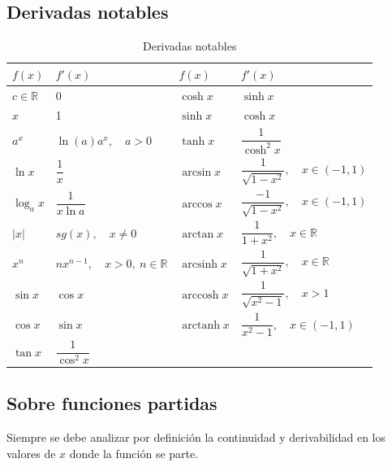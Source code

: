 \documentclass[11pt,titlepage]{article}
\DeclareMathOperator{\arcsinh}{arcsinh}
\DeclareMathOperator{\arccosh}{arccosh}
\DeclareMathOperator{\arctanh}{arctanh}
\begin{document}
\subsection{Derivadas notables}
\begin{table}[h!]
	\centering
	\setlength{\tabcolsep}{10pt} %
	\renewcommand{\arraystretch}{2.5} %
	\begin{tabularx}{\textwidth}{lX||lX}
		\toprule
		$f(x)$            & $f'(x)$                                  & $f(x)$       & $f'(x)$                                          \\
		\midrule
		$c\in \mathbb{R}$ & 0                                        & $\cosh x$    & $\sinh x$                                        \\
		$x$               & 1                                        & $\sinh x$    & $\cosh x$                                        \\
		$a^{x}$           & $\ln(a)a^{x}, \quad a>0$                 & $\tanh x$    & $\dfrac{1}{\cosh^2 x}$                           \\
		$\ln x$           & $\dfrac{1}{x}$                           & $\arcsin x$  & $\dfrac{1}{\sqrt{1-x^2}}, \quad x\in (-1,1)$     \\
		$\log_{a} x$      & $\dfrac{1}{x\ln a}$                      & $\arccos x$  & $\dfrac{-1}{\sqrt{1-x^2}}, \quad x\in (-1,1)$    \\
		$|x|$             & $sg(x), \quad x \neq 0$                  & $\arctan x$  & $\dfrac{1}{1+x^2}, \quad x\in \mathbb{R}$        \\
		$x^{n}$           & $nx^{n-1}, \quad x>0, \ n\in \mathbb{R}$ & $\arcsinh x$ & $\dfrac{1}{\sqrt{1+x^2}}, \quad x\in \mathbb{R}$ \\
		$\sin x$          & $\cos x$                                 & $\arccosh x$ & $\dfrac{1}{\sqrt{x^2 -1}}, \quad x>1$            \\
		$\cos x$          & $\sin x$                                 & $\arctanh x$ & $\dfrac{1}{x^2 -1}, \quad x\in (-1,1)$           \\
		$\tan x$          & $\dfrac{1}{\cos ^{2}x}$                  &              &                                                  \\
		\bottomrule
	\end{tabularx}
	\caption{Derivadas notables}
\end{table}

\subsection{Sobre funciones partidas}
Siempre se debe analizar por definición la continuidad y derivabilidad en los valores de $x$ donde la función se parte.
\end{document}
